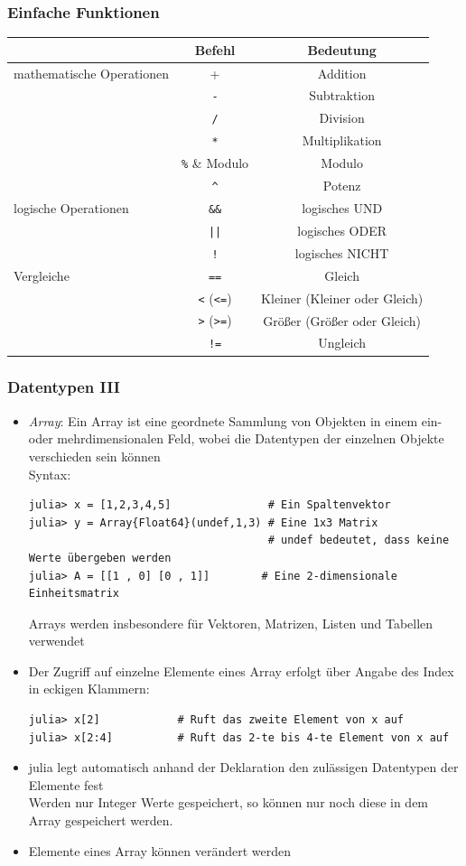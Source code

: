 \begin{frame}[fragile]
\frametitle{Einfache Funktionen}
\begin{tabular}{|l|c|c|}
\hline
 							& Befehl 		& Bedeutung\\
\hline 
mathematische Operationen 	& +			 	& Addition \\
							& \verb+-+ 		& Subtraktion \\
							& \verb+/+ 		& Division \\
							& \verb+*+ 		& Multiplikation \\
							& \verb+%+ 		& Modulo \\
							& \verb+^+ 		& Potenz \\
\hline
logische Operationen		& \verb+&&+		& logisches UND \\
							& \verb+||+		& logisches ODER \\
							& \verb+!+		& logisches NICHT \\
Vergleiche					& \verb+==+		& Gleich \\
							& \verb+<+ (\verb+<=+)		& Kleiner (Kleiner oder Gleich) \\	
							& \verb+>+ (\verb+>=+)		& Größer (Größer oder Gleich) \\
							& \verb+!=+ 	& Ungleich\\							
\hline
\end{tabular} 
\end{frame}
\begin{frame}[fragile]
\frametitle{Datentypen III}
\begin{itemize}[<+->]
\item \textit{Array}: Ein Array ist eine geordnete Sammlung von Objekten in einem ein- oder mehrdimensionalen Feld, wobei die Datentypen der einzelnen Objekte verschieden sein können\\ Syntax:
\begin{verbatim}
julia> x = [1,2,3,4,5] 	             # Ein Spaltenvektor
julia> y = Array{Float64}(undef,1,3) # Eine 1x3 Matrix
                                     # undef bedeutet, dass keine Werte übergeben werden
julia> A = [[1 , 0] [0 , 1]]        # Eine 2-dimensionale Einheitsmatrix
\end{verbatim}
Arrays werden insbesondere für Vektoren, Matrizen, Listen und Tabellen verwendet
\item Der Zugriff auf einzelne Elemente eines Array erfolgt über Angabe des Index in eckigen Klammern:
\begin{verbatim}
julia> x[2]            # Ruft das zweite Element von x auf
julia> x[2:4]          # Ruft das 2-te bis 4-te Element von x auf
\end{verbatim}
\item julia legt automatisch anhand der Deklaration den zulässigen Datentypen der Elemente fest\\
Werden nur Integer Werte gespeichert, so können nur noch diese in dem Array gespeichert werden.
\item Elemente eines Array können verändert werden
\end{itemize}
\end{frame}
